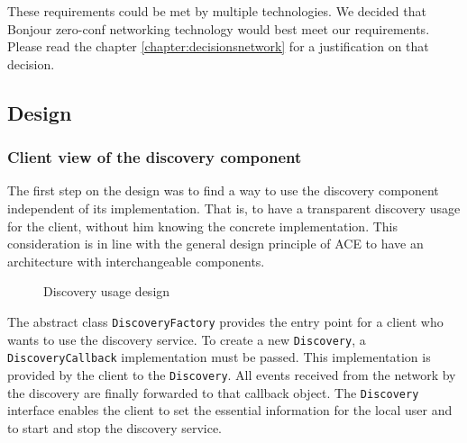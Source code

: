 These requirements could be met by multiple technologies. We decided that Bonjour zero-conf networking technology would best meet our requirements. Please read the chapter \ref{chapter:decisionsnetwork} for a justification on that decision.

\subsection{Design}
\subsubsection{Client view of the discovery component}
The first step on the design was to find a way to use the discovery component independent of its implementation. That is, to have a transparent discovery usage for the client, without him knowing the concrete implementation. This consideration is in line with the general design principle of ACE to have an architecture with interchangeable components.

\begin{figure}[H]
 \centering
 \caption{Discovery usage design}
 \label{fig:network.discovery.usage}
\end{figure}

The abstract class  \texttt{DiscoveryFactory} provides the entry point for a client who wants to use the discovery service. To create a new  \texttt{Discovery}, a  \texttt{DiscoveryCallback} implementation must be passed. This implementation is provided by the client to the \texttt{Discovery}. All events received from the network by the discovery are finally forwarded to that callback object. The  \texttt{Discovery} interface enables the client to set the  essential information for the local user and to start and stop the discovery service.

